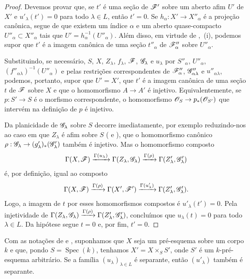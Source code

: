 \begin{proof}
Devemos provar que,
se $t'$ é uma seção de
$\mathscr{F}'$ sobre um
aberto afim $U'$ de
$X'$ e
$u'_\lambda(t')=0$
para todo
$\lambda\in L$,
então $t'=0$.
Se
$h_\alpha:X'\to
X''_\alpha$ é a
projeção canônica,
segue de
que existem um índice
$\alpha$ e um aberto
quase-compacto
$U''_\alpha\subset
X''_\alpha$ tais que
$U'=h_\alpha^{-1}
(U''_\alpha)$.
Além disso, em virtude
de ,~(i),
podemos supor que $t'$
é a imagem canônica
de uma seção
$t''_\alpha$ de
$\mathscr{F}''_\alpha$
sobre $U''_\alpha$.

Substituindo, se
necessário, $S$, $X$,
$Z_\lambda$,
$f_\lambda$,
$\mathscr{F}$,
$\mathscr{G}_\lambda$ e
$u_\lambda$ por
$S''_\alpha$,
$U''_\alpha$,
$(f''_{\alpha\lambda})
^{-1}(U''_\alpha)$
e pelas restrições
correspondentes de
$\mathscr{F}''_\alpha$,
$\mathscr{G}''_{\alpha\lambda}$
e
$u''_{\alpha\lambda}$,
podemos, portanto,
supor que $U'=X'$,
que $t'$ é a imagem
canônica de uma seção
$t$ de $\mathscr{F}$
sobre $X$ e que o
homomorfismo
$A\to A'$ é injetivo.
Equivalentemente,
se $p:S'\to S$ é o
morfismo correspondente,
o homomorfismo
$\sh{O}_S\to
p_*(\sh{O}_{S'})$
que intervém na
definição de $p$
é injetivo.

Da planicidade de
$\mathscr{G}_\lambda$
sobre $S$ decorre
imediatamente, por
exemplo reduzindo-nos
ao caso em que
$Z_\lambda$ é afim
sobre $S$
(
e ),
que o homomorfismo
canônico
$\rho:\sh{G}_\lambda
\to(g'_\lambda)_*
(\sh{G}'_\lambda)$
também é injetivo.
Mas o homomorfismo
composto
\[
\Gamma(X,\mathscr{F})
\xrightarrow{\Gamma(u_\lambda)}
\Gamma(Z_\lambda,\mathscr{G}_\lambda)
\xrightarrow{\Gamma(\rho)}
\Gamma(Z'_\lambda,\mathscr{G}'_\lambda)
\]
é, por definição,
igual ao composto
\[
\Gamma(X,\mathscr{F})
\xrightarrow{\Gamma(\rho)}
\Gamma(X',\mathscr{F}')
\xrightarrow{\Gamma(u'_\lambda)}
\Gamma(Z'_\lambda,\mathscr{G}'_\lambda).
\]
Logo, a imagem de
$t$ por esses
homomorfismos
compostos é
$u'_\lambda(t')=0$.
Pela injetividade de
$\Gamma(Z_\lambda,
\mathscr{G}_\lambda)
\xrightarrow{\Gamma(\rho)}
\Gamma(Z'_\lambda,
\mathscr{G}'_\lambda)$,
concluímos que
$u_\lambda(t)=0$
para todo
$\lambda\in L$.
Da hipótese segue
$t=0$ e, por fim,
$t'=0$.
\end{proof}

\begin{proposition}[11.9.13]
\label{IV.11.9.13}
Com as notações de
 e
,
suponhamos que $X$
seja um pré-esquema
sobre um corpo $k$ e
que, pondo
$S=\operatorname{Spec}(k)$,
tenhamos
$X'=X\times_S S'$,
onde $S'$ é um
$k$-pré-esquema
arbitrário. Se a
família
$(u_\lambda)_{\lambda\in L}$
é separante, então
$(u'_\lambda)$
também é separante.
\end{proposition}

